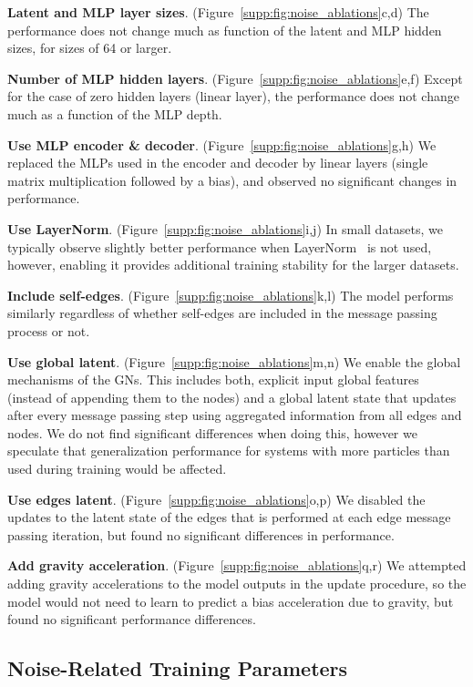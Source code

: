 \documentclass{article}
\newcommand{\xhdr}[1]{{\noindent\bfseries #1}.}
\newcommand\figref[1]{Figure~\ref{#1}}
\begin{document}
\xhdr{Latent and MLP layer sizes}
(\figref{supp:fig:noise_ablations}c,d) The performance does not change much as function of the latent and MLP hidden sizes, for sizes of 64 or larger.

\xhdr{Number of MLP hidden layers}
(\figref{supp:fig:noise_ablations}e,f) Except for the case of zero hidden layers (linear layer), the performance does not change much as a function of the MLP depth.

\xhdr{Use MLP encoder \& decoder}
(\figref{supp:fig:noise_ablations}g,h) We replaced the MLPs used in the encoder and decoder by linear layers (single matrix multiplication followed by a bias), and observed no significant changes in performance.

\xhdr{Use LayerNorm}
(\figref{supp:fig:noise_ablations}i,j) In small datasets, we typically observe slightly better performance when LayerNorm~\cite{ba2016layer} is not used, however, enabling it provides additional training stability for the larger datasets.

\xhdr{Include self-edges}
(\figref{supp:fig:noise_ablations}k,l) The model performs similarly regardless of whether self-edges are included in the message passing process or not.

\xhdr{Use global latent}
(\figref{supp:fig:noise_ablations}m,n) We enable the global mechanisms of the GNs. This includes both, explicit input global features (instead of appending them to the nodes) and a global latent state that updates after every message passing step using aggregated information from all edges and nodes. We do not find significant differences when doing this, however we speculate that generalization performance for systems with more particles than used during training would be affected.

\xhdr{Use edges latent}
(\figref{supp:fig:noise_ablations}o,p) We disabled the updates to the latent state of the edges that is performed at each edge message passing iteration, but found no significant differences in performance.

\xhdr{Add gravity acceleration}
(\figref{supp:fig:noise_ablations}q,r) We attempted adding gravity accelerations to the model outputs in the update procedure, so the model would not need to learn to predict a bias acceleration due to gravity, but found no significant performance differences.

\subsection{Noise-Related Training Parameters}
\end{document}
